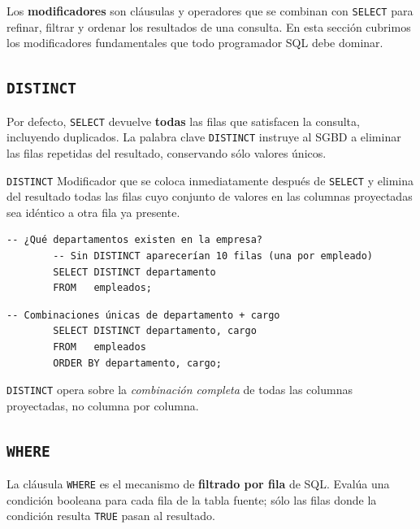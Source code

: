 \documentclass[12pt, a4paper]{article}
\begin{document}
	Los \textbf{modificadores} son cláusulas y operadores que se
	combinan con \texttt{SELECT} para refinar, filtrar y ordenar los
	resultados de una consulta.
	En esta sección cubrimos los modificadores fundamentales que
	todo programador SQL debe dominar.
	
	\subsection{\texttt{DISTINCT}}
	
	Por defecto, \texttt{SELECT} devuelve \textbf{todas} las filas que
	satisfacen la consulta, incluyendo duplicados.
	La palabra clave \texttt{DISTINCT} instruye al SGBD a eliminar las
	filas repetidas del resultado, conservando sólo valores únicos.
	
	\begin{definicion}{\texttt{DISTINCT}}
		Modificador que se coloca inmediatamente después de \texttt{SELECT}
		y elimina del resultado todas las filas cuyo conjunto de valores en
		las columnas proyectadas sea idéntico a otra fila ya presente.
	\end{definicion}
	
	\begin{lstlisting}[caption={DISTINCT sobre una columna.}]
		-- ¿Qué departamentos existen en la empresa?
		-- Sin DISTINCT aparecerían 10 filas (una por empleado)
		SELECT DISTINCT departamento
		FROM   empleados;
	\end{lstlisting}
	
	\begin{lstlisting}[caption={DISTINCT sobre múltiples columnas.}]
		-- Combinaciones únicas de departamento + cargo
		SELECT DISTINCT departamento, cargo
		FROM   empleados
		ORDER BY departamento, cargo;
	\end{lstlisting}
	
	\begin{nota}
		\texttt{DISTINCT} opera sobre la \textit{combinación completa} de
		todas las columnas proyectadas, no columna por columna.
	\end{nota}
	
	\subsection{\texttt{WHERE}}
	
	La cláusula \texttt{WHERE} es el mecanismo de \textbf{filtrado por
		fila} de SQL.
	Evalúa una condición booleana para cada fila de la tabla fuente;
	sólo las filas donde la condición resulta \texttt{TRUE} pasan al
	resultado.
	
\end{document}
